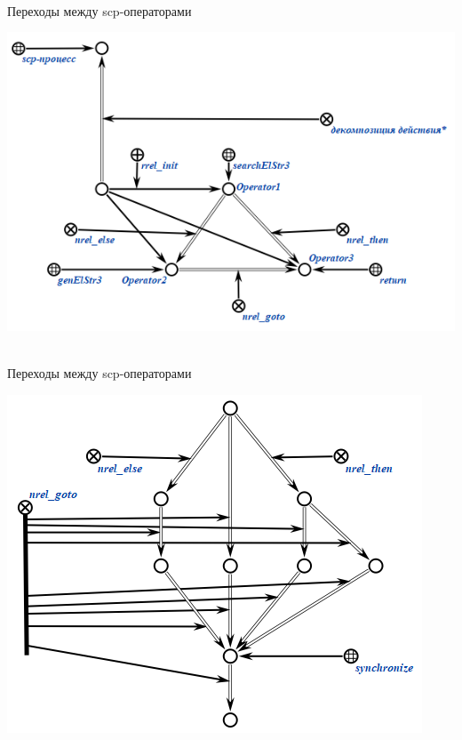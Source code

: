 \begin{frame}{\\Переходы между scp-операторами}
	\topline
	\justifying
	
	\vspace{10mm}
	
	\begin{center}
	\includegraphics[scale=0.7]{figures/sd_scp/operators_order1.png}
	\end{center}
	
\end{frame}

\begin{frame}{\\Переходы между scp-операторами}
	\topline
	\justifying
	
	\vspace{10mm}
	
	\begin{center}
		\includegraphics[scale=0.7]{figures/sd_scp/operators_order2.png}
	\end{center}
	
\end{frame}

